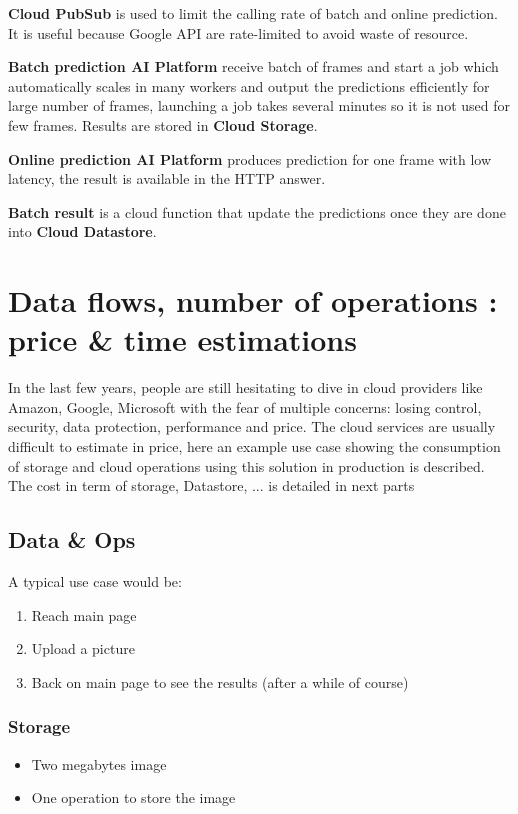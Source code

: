 \textbf{Cloud PubSub} is used to limit the calling rate of batch and online prediction. It is useful because Google API are rate-limited to avoid waste of resource. 

\textbf{Batch prediction AI Platform} receive batch of frames and start a job which automatically scales in many workers and output the predictions efficiently for large number of frames, launching a job takes several minutes so it is not used for few frames.
Results are stored in \textbf{Cloud Storage}.

\textbf{Online prediction AI Platform} produces prediction for one frame with low latency, the result is available in the HTTP answer.

\textbf{Batch result} is a cloud function that update the predictions once they are done into \textbf{Cloud Datastore}.

\pagebreak\section{Data flows, number of operations : price \& time estimations}

In the last few years, people are still hesitating to dive in cloud providers like Amazon, Google, Microsoft with the fear of multiple concerns: losing control, security, data protection, performance and price.
The cloud services are usually difficult to estimate in price, here an example use case showing the consumption of storage and cloud operations using this solution in production is described.
The cost in term of storage, Datastore, ... is detailed in next parts

\subsection{Data \& Ops}
A typical use case would be: 
\begin{enumerate}
    \item Reach main page
    \item Upload a picture
    \item Back on main page to see the results (after a while of course)
\end{enumerate}

\subsubsection{Storage}
\begin{itemize}
    \item Two megabytes image
    \item One operation to store the image
\end{itemize}
